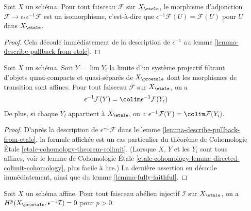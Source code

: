 \begin{lemma}
\label{lemma-fully-faithful}
Soit $X$ un schéma. Pour tout faisceau $\mathcal{F}$ sur $X_\etale$,
le morphisme d'adjonction $\mathcal{F} \to \epsilon_*\epsilon^{-1}\mathcal{F}$ est un
isomorphisme, c'est-à-dire que $\epsilon^{-1}\mathcal{F}(U) = \mathcal{F}(U)$
pour $U$ dans $X_\etale$.
\end{lemma}

\begin{proof}
Cela découle immédiatement de la description de
$\epsilon^{-1}$ au lemme \ref{lemma-describe-pullback-from-etale}.
\end{proof}

\begin{lemma}
\label{lemma-limit-pullback}
Soit $X$ un schéma. Soit $Y = \lim Y_i$ la limite d'un système projectif filtrant
d'objets quasi-compacts et quasi-séparés de $X_\proetale$
dont les morphismes de transition sont affines. Pour tout faisceau $\mathcal{F}$ sur $X_\etale$,
on a
$$
\epsilon^{-1}\mathcal{F}(Y) = \colim \epsilon^{-1}\mathcal{F}(Y_i)
$$
De plus, si chaque $Y_i$ appartient à $X_\etale$, on a
$\epsilon^{-1}\mathcal{F}(Y) = \colim \mathcal{F}(Y_i)$.
\end{lemma}

\begin{proof}
D'après la description de $\epsilon^{-1}\mathcal{F}$ dans le
lemme \ref{lemma-describe-pullback-from-etale}, la formule affichée
est un cas particulier du théorème de Cohomologie \'Etale
\ref{etale-cohomology-theorem-colimit}.
(Lorsque $X$, $Y$ et les $Y_i$ sont tous affines, voir le
lemme de Cohomologie \'Etale
\ref{etale-cohomology-lemma-directed-colimit-cohomology}, plus facile à lire.)
La dernière assertion en découle immédiatement,
ainsi que du lemme \ref{lemma-fully-faithful}.
\end{proof}

\begin{lemma}
\label{lemma-affine-vanishing}
Soit $X$ un schéma affine. Pour tout faisceau abélien injectif $\mathcal{I}$ sur
$X_\etale$, on a $H^p(X_\proetale, \epsilon^{-1}\mathcal{I}) = 0$
pour $p > 0$.
\end{lemma}

